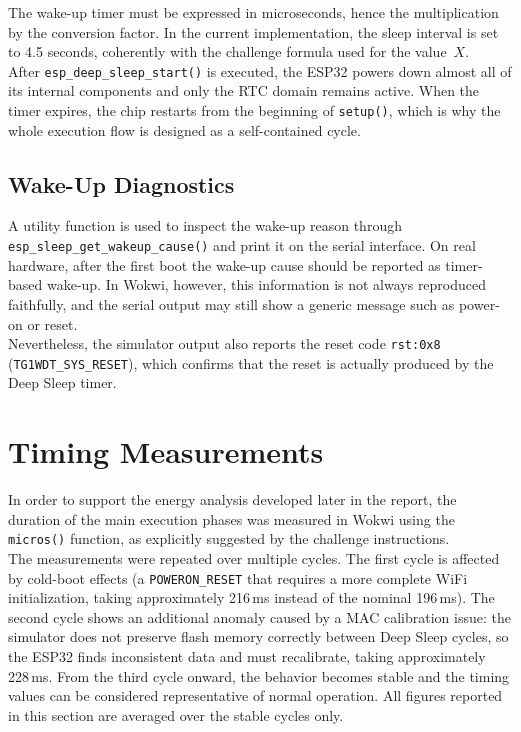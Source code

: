 \documentclass[a4paper,11pt]{article}
\begin{document}
The wake-up timer must be expressed in microseconds, hence the multiplication by the
conversion factor. In the current implementation, the sleep interval is set to
4.5 seconds, coherently with the challenge formula used for the value~$X$.\\

After \texttt{esp\_deep\_sleep\_start()} is executed, the ESP32 powers down almost
all of its internal components and only the RTC domain remains active. When the timer
expires, the chip restarts from the beginning of \texttt{setup()}, which is why the
whole execution flow is designed as a self-contained cycle.

\subsection{Wake-Up Diagnostics}

A utility function is used to inspect the wake-up reason through
\texttt{esp\_sleep\_get\_wakeup\_cause()} and print it on the serial interface. On
real hardware, after the first boot the wake-up cause should be reported as
timer-based wake-up. In Wokwi, however, this information is not always reproduced
faithfully, and the serial output may still show a generic message such as power-on
or reset.\\

Nevertheless, the simulator output also reports the reset code \texttt{rst:0x8}
(\texttt{TG1WDT\_SYS\_RESET}), which confirms that the reset is actually produced by
the Deep Sleep timer.

\section{Timing Measurements}

In order to support the energy analysis developed later in the report, the duration
of the main execution phases was measured in Wokwi using the \texttt{micros()}
function, as explicitly suggested by the challenge instructions.\\

The measurements were repeated over multiple cycles. The first cycle is affected by
cold-boot effects (a \texttt{POWERON\_RESET} that requires a more complete WiFi
initialization, taking approximately 216\,ms instead of the nominal 196\,ms). The
second cycle shows an additional anomaly caused by a MAC calibration issue: the
simulator does not preserve flash memory correctly between Deep Sleep cycles, so the
ESP32 finds inconsistent data and must recalibrate, taking approximately 228\,ms.
From the third cycle onward, the behavior becomes stable and the timing values can be
considered representative of normal operation. All figures reported in this section
are averaged over the stable cycles only.\\
\end{document}
